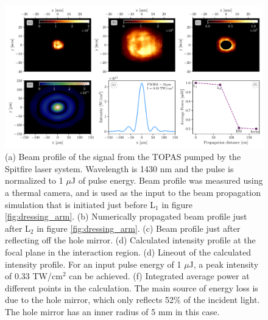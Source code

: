 \begin{figure}%
	\includegraphics[width=\textwidth]{figures/Beamline/pump_intensity_profiles_1430nm_1uj.pdf}
	\caption[Calculation of dressing intensity]{(a) Beam profile of the signal from the TOPAS pumped by the Spitfire laser system.  Wavelength is 1430 nm and the pulse is normalized to 1 $\mu$J of pulse energy.  Beam profile was measured using a thermal camera, and is used as the input to the beam propagation simulation that is initiated just before L$_1$ in figure \ref{fig:dressing_arm}. (b) Numerically propagated beam profile just after L$_2$ in figure \ref{fig:dressing_arm}. (c) Beam profile just after reflecting off the hole mirror.  (d) Calculated intensity profile at the focal plane in the interaction region. (d) Lineout of the calculated intensity profile.  For an input pulse energy of 1 $\mu$J, a peak intensity of 0.33 TW/cm$^2$ can be achieved.  (f) Integrated average power at different points in the calculation.  The main source of energy loss is due to the hole mirror, which only reflects 52\% of the incident light.  The hole mirror has an inner radius of 5 mm in this case.}
	\label{fig:dressing_intensity}
\end{figure}


